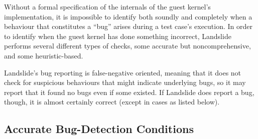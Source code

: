 Without a formal specification of the internals of the guest kernel's implementation\cite{sel4}, it is impossible to identify both soundly and completely when a behaviour that constitutes a ``bug'' arises during a test case's execution.
In order to identify when the guest kernel has done something incorrect, Landslide performs several different types of checks, some accurate but noncomprehensive, and some heuristic-based.

Landslide's bug reporting is false-negative oriented, meaning that it does not check for suspicious behaviours that might indicate underlying bugs, so it may report that it found no bugs even if some existed. If Landslide does report a bug, though, it is almost certainly correct (except in cases as listed below).

\subsection{Accurate Bug-Detection Conditions}

